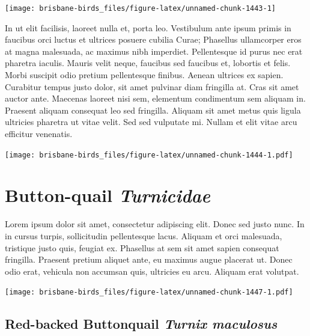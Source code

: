 \documentclass[]{book}
\let\origfigure\figure
\let\endorigfigure\endfigure
\renewenvironment{figure}[1][2] {
  \expandafter\origfigure\expandafter[H]
} {
  \endorigfigure
}
\begin{document}
\begin{figure}
\texttt{[image: brisbane-birds\_files/figure-latex/unnamed-chunk-1443-1]} \caption{insert figure caption}\label{fig:unnamed-chunk-1443}
\end{figure}

In ut elit facilisis, laoreet nulla et, porta leo. Vestibulum ante ipsum
primis in faucibus orci luctus et ultrices posuere cubilia Curae;
Phasellus ullamcorper eros at magna malesuada, ac maximus nibh
imperdiet. Pellentesque id purus nec erat pharetra iaculis. Mauris velit
neque, faucibus sed faucibus et, lobortis et felis. Morbi suscipit odio
pretium pellentesque finibus. Aenean ultrices ex sapien. Curabitur
tempus justo dolor, sit amet pulvinar diam fringilla at. Cras sit amet
auctor ante. Maecenas laoreet nisi sem, elementum condimentum sem
aliquam in. Praesent aliquam consequat leo sed fringilla. Aliquam sit
amet metus quis ligula ultricies pharetra ut vitae velit. Sed sed
vulputate mi. Nullam et elit vitae arcu efficitur venenatis.

\begin{figure}
\centering
\texttt{[image: brisbane-birds\_files/figure-latex/unnamed-chunk-1444-1.pdf]}
\caption{\label{fig:unnamed-chunk-1444}insert figure caption}
\end{figure}

\chapter{\texorpdfstring{Button-quail
\emph{Turnicidae}}{Button-quail Turnicidae}}\label{button-quail-turnicidae}

Lorem ipsum dolor sit amet, consectetur adipiscing elit. Donec sed justo
nunc. In in cursus turpis, sollicitudin pellentesque lacus. Aliquam et
orci malesuada, tristique justo quis, feugiat ex. Phasellus at sem sit
amet sapien consequat fringilla. Praesent pretium aliquet ante, eu
maximus augue placerat ut. Donec odio erat, vehicula non accumsan quis,
ultricies eu arcu. Aliquam erat volutpat.

\texttt{[image: brisbane-birds\_files/figure-latex/unnamed-chunk-1447-1.pdf]}

\section{\texorpdfstring{Red-backed Buttonquail \emph{Turnix
maculosus}}{Red-backed Buttonquail Turnix maculosus}}\label{red-backed-buttonquail-turnix-maculosus}
\end{document}
